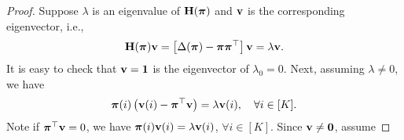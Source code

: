 \documentclass[10pt]{article}
\begin{document}
\begin{proof}
Suppose $\lambda$ is an eigenvalue of ${\mathbf{H}}({\boldsymbol{\pi}})$ and ${\mathbf{v}}$ is the corresponding eigenvector, i.e.,
\begin{equation*}
    {\mathbf{H}}({\boldsymbol{\pi}}) {\mathbf{v}} = \left[ \Delta({\boldsymbol{\pi}}) - {\boldsymbol{\pi}}{\boldsymbol{\pi}}^\top \right] {\mathbf{v}} = \lambda {\mathbf{v}}.
\end{equation*}
It is easy to check that ${\mathbf{v}} = {\mathbf{1}}$ is the eigenvector of $\lambda_0 = 0$. Next, assuming $\lambda \not= 0$, we have
\begin{equation*}
    {\boldsymbol{\pi}}(i) \left( {\mathbf{v}}(i) - {\boldsymbol{\pi}}^\top {\mathbf{v}} \right) = \lambda {\mathbf{v}}(i), \quad \forall i \in [K].
\end{equation*}
Note if ${\boldsymbol{\pi}}^\top {\mathbf{v}} = 0$, we have ${\boldsymbol{\pi}}(i) {\mathbf{v}}(i) = \lambda {\mathbf{v}}(i)$, $\forall i \in [K]$. Since ${\mathbf{v}} \not= {\mathbf{0}}$, assume 
\end{proof}
\end{document}
